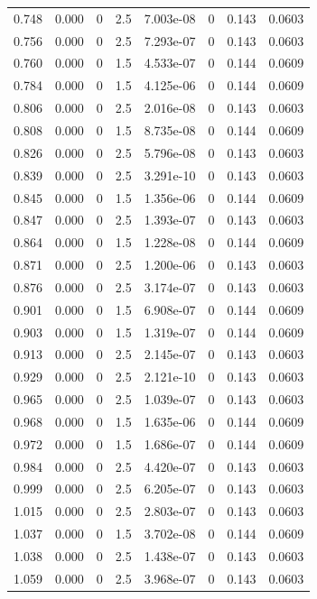 \documentclass[preview]{standalone}
\begin{document}
{{{\begin{tabular}{L{1.2cm}C{1.2cm} C{0.3cm}C{0.5cm} C{1.4cm}C{1.4cm} C{1.4cm}C{1.4cm}}
  0.748  &  0.000  & 0     & 2.5 &  7.003e-08  & 0  & 0.143 &  0.0603   \\ 
  0.756  &  0.000  & 0     & 2.5 &  7.293e-07  & 0  & 0.143 &  0.0603   \\ 
  0.760  &  0.000  & 0     & 1.5 &  4.533e-07  & 0  & 0.144 &  0.0609   \\ 
  0.784  &  0.000  & 0     & 1.5 &  4.125e-06  & 0  & 0.144 &  0.0609   \\ 
  0.806  &  0.000  & 0     & 2.5 &  2.016e-08  & 0  & 0.143 &  0.0603   \\ 
  0.808  &  0.000  & 0     & 1.5 &  8.735e-08  & 0  & 0.144 &  0.0609   \\ 
  0.826  &  0.000  & 0     & 2.5 &  5.796e-08  & 0  & 0.143 &  0.0603   \\ 
  0.839  &  0.000  & 0     & 2.5 &  3.291e-10  & 0  & 0.143 &  0.0603   \\ 
  0.845  &  0.000  & 0     & 1.5 &  1.356e-06  & 0  & 0.144 &  0.0609   \\ 
  0.847  &  0.000  & 0     & 2.5 &  1.393e-07  & 0  & 0.143 &  0.0603   \\ 
  0.864  &  0.000  & 0     & 1.5 &  1.228e-08  & 0  & 0.144 &  0.0609   \\ 
  0.871  &  0.000  & 0     & 2.5 &  1.200e-06  & 0  & 0.143 &  0.0603   \\ 
  0.876  &  0.000  & 0     & 2.5 &  3.174e-07  & 0  & 0.143 &  0.0603   \\ 
  0.901  &  0.000  & 0     & 1.5 &  6.908e-07  & 0  & 0.144 &  0.0609   \\ 
  0.903  &  0.000  & 0     & 1.5 &  1.319e-07  & 0  & 0.144 &  0.0609   \\ 
  0.913  &  0.000  & 0     & 2.5 &  2.145e-07  & 0  & 0.143 &  0.0603   \\ 
  0.929  &  0.000  & 0     & 2.5 &  2.121e-10  & 0  & 0.143 &  0.0603   \\ 
  0.965  &  0.000  & 0     & 2.5 &  1.039e-07  & 0  & 0.143 &  0.0603   \\ 
  0.968  &  0.000  & 0     & 1.5 &  1.635e-06  & 0  & 0.144 &  0.0609   \\ 
  0.972  &  0.000  & 0     & 1.5 &  1.686e-07  & 0  & 0.144 &  0.0609   \\ 
  0.984  &  0.000  & 0     & 2.5 &  4.420e-07  & 0  & 0.143 &  0.0603   \\ 
  0.999  &  0.000  & 0     & 2.5 &  6.205e-07  & 0  & 0.143 &  0.0603   \\ 
  1.015  &  0.000  & 0     & 2.5 &  2.803e-07  & 0  & 0.143 &  0.0603   \\ 
  1.037  &  0.000  & 0     & 1.5 &  3.702e-08  & 0  & 0.144 &  0.0609   \\ 
  1.038  &  0.000  & 0     & 2.5 &  1.438e-07  & 0  & 0.143 &  0.0603   \\ 
  1.059  &  0.000  & 0     & 2.5 &  3.968e-07  & 0  & 0.143 &  0.0603   \\ 
\hline 
\end{tabular} 

}}}
\end{document}
